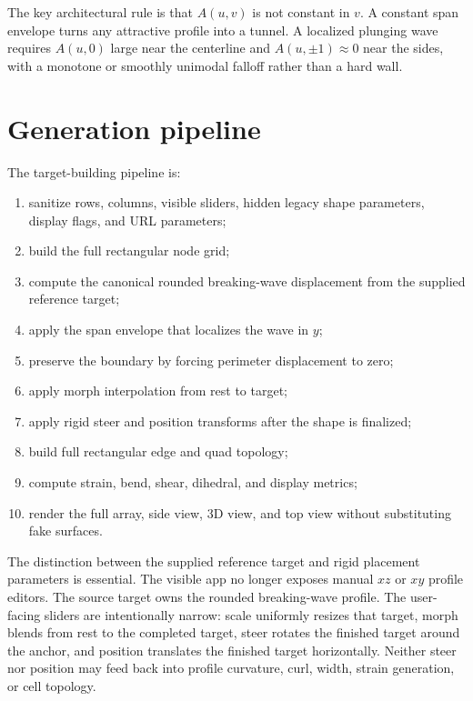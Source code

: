 \documentclass[12pt,letterpaper]{article}
\begin{document}
The key architectural rule is that \(A(u,v)\) is not constant in \(v\). A constant span envelope turns any attractive profile into a tunnel. A localized plunging wave requires \(A(u,0)\) large near the centerline and \(A(u,\pm1)\approx0\) near the sides, with a monotone or smoothly unimodal falloff rather than a hard wall.

\section{Generation pipeline}

The target-building pipeline is:
\begin{enumerate}
  \item sanitize rows, columns, visible sliders, hidden legacy shape parameters, display flags, and URL parameters;
  \item build the full rectangular node grid;
  \item compute the canonical rounded breaking-wave displacement from the supplied reference target;
  \item apply the span envelope that localizes the wave in \(y\);
  \item preserve the boundary by forcing perimeter displacement to zero;
  \item apply morph interpolation from rest to target;
  \item apply rigid steer and position transforms after the shape is finalized;
  \item build full rectangular edge and quad topology;
  \item compute strain, bend, shear, dihedral, and display metrics;
  \item render the full array, side view, 3D view, and top view without substituting fake surfaces.
\end{enumerate}

The distinction between the supplied reference target and rigid placement parameters is essential. The visible app no longer exposes manual \(xz\) or \(xy\) profile editors. The source target owns the rounded breaking-wave profile. The user-facing sliders are intentionally narrow: scale uniformly resizes that target, morph blends from rest to the completed target, steer rotates the finished target around the anchor, and position translates the finished target horizontally. Neither steer nor position may feed back into profile curvature, curl, width, strain generation, or cell topology.
\end{document}
